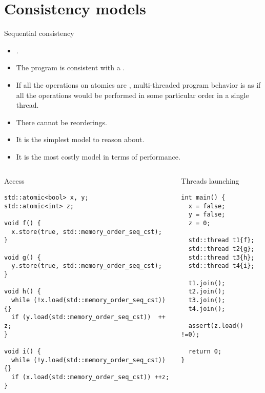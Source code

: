 \section{Consistency models}

\begin{frame}[t]{Sequential consistency}
\begin{itemize}
  \item {}.
  \item The program is consistent with a .
  \item If all the operations on atomics are , 
        multi-threaded program behavior is as if all the operations would be
        performed in some particular order in a single thread.
  \item There cannot be reorderings.
  \item It is the simplest model to reason about.
  \item It is the most costly model in terms of performance.
\end{itemize}
\end{frame}

\begin{frame}[fragile]
\begin{columns}

\begin{column}{.6\textwidth}
\begin{block}{Access}
\begin{lstlisting}
std::atomic<bool> x, y;
std::atomic<int> z;

void f() {
  x.store(true, std::memory_order_seq_cst);
}

void g() {
  y.store(true, std::memory_order_seq_cst);
}

void h() {
  while (!x.load(std::memory_order_seq_cst)) {}
  if (y.load(std::memory_order_seq_cst))  ++ z;
}

void i() {
  while (!y.load(std::memory_order_seq_cst)) {}
  if (x.load(std::memory_order_seq_cst)) ++z;
}
\end{lstlisting}
\end{block}
\end{column}

\pause

\begin{column}{.4\textwidth}
\begin{block}{Threads launching}
\begin{lstlisting}
int main() {
  x = false;
  y = false;
  z = 0;

  std::thread t1{f};
  std::thread t2{g};
  std::thread t3{h};
  std::thread t4{i};

  t1.join();
  t2.join();
  t3.join();
  t4.join();

  assert(z.load() !=0);

  return 0;
}
\end{lstlisting}
\end{block}
\end{column}

\end{columns}
\end{frame}

